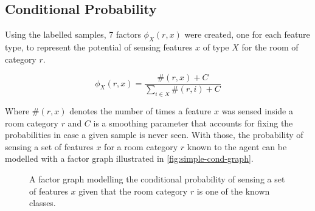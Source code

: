 \subsection{Conditional Probability}
Using the labelled samples, 7 factors $\phi_X(r,x)$ were created, one for each
feature type, to represent the potential of sensing features $x$ of type $X$ for
the room of category $r$.

\begin{equation}
\phi_X(r,x) = \frac{\#(r,x)+C}{\sum_{i \in X}{\#(r,i)+C}}
\end{equation}

Where $\#(r,x)$ denotes the number of times a feature $x$ was sensed inside a
room category $r$ and $C$ is a smoothing parameter that accounts for fixing
the probabilities in case a given sample is never seen.
With those, the probability of sensing a set of features $x$ for a room category
$r$ known to the agent can be modelled with a factor graph illustrated in
\autoref{fig:simple-cond-graph}.

\begin{figure}[h]
\centering
{}
\caption{\label{fig:simple-cond-graph}A factor graph modelling the conditional
probability of sensing a set of features $x$ given that the room category $r$ is
one of the known classes.}
\end{figure}

